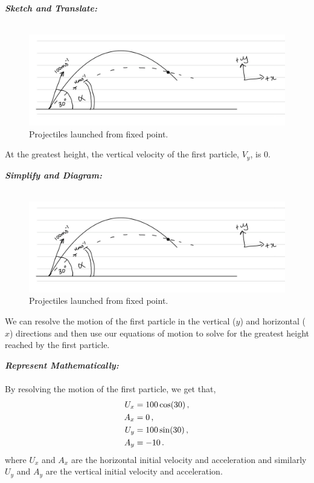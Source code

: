\begin{subquestions}
	
\subquestion

\textbf{\textit{Sketch and Translate:}} \\ \\
\begin{figure}[H]
	\begin{center}
		\includegraphics[scale=0.25]{../2008/figures/2008Jq6-1}
		\caption{\label{2008J:q6:Sketch1} Projectiles launched from fixed point.}
	\end{center}
\end{figure}
At the greatest height, the vertical velocity of the first particle, $V_y$, is 0.




\textbf{\textit{Simplify and Diagram:}} \\ \\
\begin{figure}[H]
	\begin{center}
		\includegraphics[scale=0.25]{../2008/figures/2008Jq6-1}
		\caption{\label{2008J:q6:Diagram1} Projectiles launched from fixed point.}
	\end{center}
\end{figure}
We can resolve the motion of the first particle in the vertical ($y$) and horizontal ($x$) directions and then use our equations of motion to solve for the greatest height reached by the first particle.




\textbf{\textit{Represent Mathematically:}} \\ \\
By resolving the motion of the first particle, we get that,
\begin{align}
	U_x & = 100 \cos(30) \,, \nonumber \\
	A_x & = 0 \,, \nonumber \\
	U_y & = 100 \sin(30) \,, \nonumber \\
	A_y & = -10 \,. 
\end{align}
where $U_x$ and $A_x$ are the horizontal initial velocity and acceleration and similarly $U_y$ and $A_y$ are the vertical initial velocity and acceleration.


\end{subquestions}
